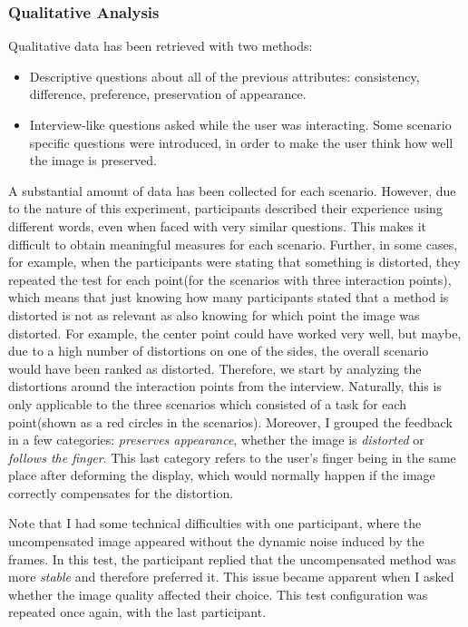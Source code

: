 \documentclass[]{article}
\begin{document}
\subsubsection{Qualitative Analysis}
\label{sec:QualitativeAnalysis}
Qualitative data has been retrieved with two methods: 
\begin{itemize}[noitemsep,topsep=0pt]
\item Descriptive questions about all of the previous attributes: consistency, difference, preference, preservation of appearance.
\item Interview-like questions asked while the user was interacting. Some scenario specific questions were introduced, in order to make the user think how well the image is preserved.
\end{itemize} 

A substantial amount of data has been collected for each scenario. However, due to the nature of this experiment, participants described their experience using different words, even when faced with very similar questions. This makes it difficult to obtain meaningful measures for each scenario. Further, in some cases, for example, when the participants were stating that something is distorted, they repeated the test for each point(for the scenarios with three interaction points), which means that just knowing how many participants stated that a method is distorted is not as relevant as also knowing for which point the image was distorted. For example, the center point could have worked very well, but maybe, due to a high number of distortions on one of the sides, the overall scenario would have been ranked as distorted. Therefore, we start by analyzing the distortions around the interaction points from the interview. Naturally, this is only applicable to the three scenarios which consisted of a task for each point(shown as a red circles in the scenarios). Moreover, I grouped the feedback in a few categories: \textit{preserves appearance}, whether the image is \textit{distorted} or \textit{follows the finger}. This last category refers to the user's finger being in the same place after deforming the display, which would normally happen if the image correctly compensates for the distortion.

Note that I had some technical difficulties with one participant, where the uncompensated image appeared without the dynamic noise induced by the frames. In this test, the participant replied that the uncompensated method was more \textit{stable} and therefore preferred it. This issue became apparent when I asked whether the image quality affected their choice. This test configuration was repeated once again, with the last participant.
\end{document}
